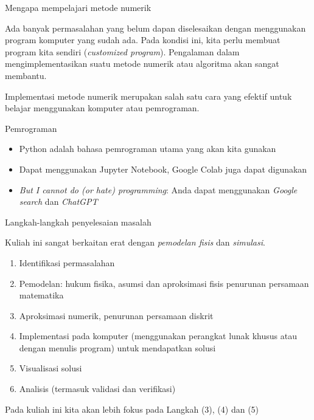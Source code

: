 \begin{frame}{Mengapa mempelajari metode numerik}

Ada banyak permasalahan yang belum dapan diselesaikan dengan menggunakan
program komputer yang sudah ada. Pada kondisi ini, kita perlu membuat program
kita sendiri (\textit{customized program}).
Pengalaman dalam mengimplementasikan suatu metode numerik
atau algoritma akan sangat membantu.

Implementasi metode numerik merupakan salah satu cara yang efektif untuk
belajar menggunakan komputer atau pemrograman.


\end{frame}



\begin{frame}{Pemrograman}

\begin{itemize}
\item Python adalah bahasa pemrograman utama yang akan kita gunakan
\item Dapat menggunakan Jupyter Notebook, Google Colab juga dapat digunakan
\item \textit{But I cannot do (or hate) programming}:
Anda dapat menggunakan \textit{Google search} dan \textit{ChatGPT}
\end{itemize}

\end{frame}



\begin{frame}{Langkah-langkah penyelesaian masalah}

Kuliah ini sangat berkaitan erat dengan \textit{pemodelan fisis}
dan \textit{simulasi}.

\begin{enumerate}[(1)]
\item Identifikasi permasalahan
\item Pemodelan: hukum fisika, asumsi dan aproksimasi fisis penurunan
  persamaan matematika
\item Aproksimasi numerik, penurunan persamaan diskrit
\item Implementasi pada komputer (menggunakan perangkat lunak khusus atau
  dengan menulis program) untuk mendapatkan solusi
\item Visualisasi solusi
\item Analisis (termasuk validasi dan verifikasi)
\end{enumerate}

Pada kuliah ini kita akan lebih fokus pada Langkah (3), (4) dan (5)
\end{frame}


